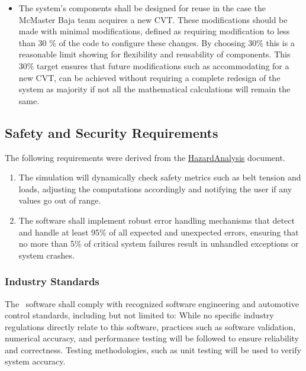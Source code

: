 \documentclass[12pt]{article}
\begin{document}
\begin{itemize}
\item[NFR:RE \label{NFR:RE}:]  The system's components shall be designed for reuse in the case the McMaster Baja team acquires a new CVT. 
These modifications should be made with minimal modifications, defined as requiring modification to less than 30 \% of the code to configure these changes.
By choosing 30\% this is a reasonable limit showing for flexibility and reusability of components. 
This 30\% target ensures that future modifications such as accommodating for a new CVT, can be achieved without requiring a complete redesign of the system as majority if not all the mathematical calculations will remain the same.

\end{itemize}

\subsection{Safety and Security Requirements}
The following requirements were derived from the \href{https://github.com/gr812b/CVT-Simulator/blob/main/docs/HazardAnalysis/HazardAnalysis.pdf#page=40}{HazardAnalysis} document.
\begin{enumerate}[label=\textbf{SR\arabic*}]
  \item \label{sr:load-balancing} The simulation will dynamically check safety metrics such as belt tension and loads, adjusting the computations accordingly and notifying the user if any values go out of range.
  \item \label{sr:error-handling} The software shall implement robust error handling mechanisms that detect and handle at least 95\% of all expected and unexpected errors, ensuring that no more than 5\% of critical system failures result in unhandled exceptions or system crashes.
\end{enumerate}

\subsubsection{Industry Standards}
The \progname \ software shall comply with recognized software engineering and automotive control standards, including but not limited to:
While no specific industry regulations directly relate to this software, practices such as software validation, numerical accuracy, and performance testing will be followed to ensure reliability and correctness. 
Testing methodologies, such as unit testing will be used to verify system accuracy.
\end{document}
